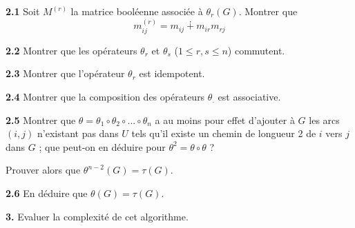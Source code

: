 \documentclass{article}
\begin{document}
\textbf{2.1 } Soit $M^{(r)}$ la matrice booléenne associée à
$\theta_r(G)$. Montrer que
\begin{equation}
  m_{ij}^{(r)} = m_{ij} \dotplus m_{ir}m_{rj}
\end{equation}

\textbf{2.2} Montrer que les opérateurs $\theta_r$ et $\theta_s$
 ($1 \leq r,s \leq n$) commutent.

\textbf{2.3} Montrer que l'opérateur $\theta_r$ est idempotent.

\textbf{2.4} Montrer que la composition des opérateurs $\theta_{.}$
est associative.

\textbf{2.5} Montrer que $\theta = \theta_1 \circ  \theta_2 \circ
... \circ \theta_n$ a au moins pour effet d'ajouter à $G$ les arcs
$(i,j)$ n'existant pas dans $U$ tels qu'il existe un chemin de
longueur 2 de $i$ vers $j$ dans $G$ ; que peut-on en déduire pour
$\theta^2 = \theta \circ \theta$ ?

Prouver alors que $\theta^{n-2}(G) = \tau(G)$.

\textbf{2.6 } En déduire que $\theta(G) = \tau (G)$.

\textbf{3. } Evaluer la complexité de cet algorithme.
\end{document}

